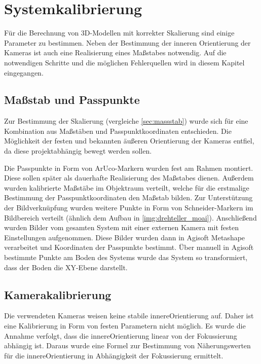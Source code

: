 \documentclass[./00PhotoBox.tex]{subfiles}
\begin{document}
\chapter{Systemkalibrierung}
\label{ch:kalibrierung}

Für die Berechnung von 3D-Modellen mit korrekter Skalierung sind einige Parameter zu bestimmen. Neben der Bestimmung der inneren Orientierung der Kameras ist auch eine Realisierung eines Maßstabes notwendig. Auf die notwendigen Schritte und die möglichen Fehlerquellen wird in diesem Kapitel eingegangen.

\section{Maßstab und Passpunkte}
\label{sec:passpunkt_bestimmung}
Zur Bestimmung der Skalierung (vergleiche \autoref{sec:massstab}) wurde sich für eine Kombination aus Maß\-stäben und Passpunktkoordinaten entschieden. Die Möglichkeit der festen und bekannten äußeren Orientierung der Kameras entfiel, da diese projektabhängig bewegt werden sollen.

Die Passpunkte in Form von ArUco-Markern wurden fest am Rahmen montiert. Diese sollen später als dauerhafte Realisierung des Maßstabes dienen. Außerdem wurden kalibrierte Maßstäbe im Objektraum verteilt, welche für die erstmalige Bestimmung der Passpunktkoordinaten den Maßstab bilden. Zur Unterstützung der Bildverknüpfung wurden weitere Punkte in Form von Schneider-Markern im Bildbereich verteilt (ähnlich dem Aufbau in \autoref{img:drehteller_moai}). Anschließend wurden Bilder vom gesamten System mit  einer externen Kamera mit festen Einstellungen aufgenommen. Diese Bilder wurden dann in Agisoft Metashape verarbeitet und Koordinaten der Passpunkte bestimmt. Über manuell in Agisoft bestimmte Punkte am Boden des Systems wurde das System so transformiert, dass der Boden die XY-Ebene darstellt.

\section{Kamerakalibrierung}
Die verwendeten Kameras weisen keine stabile \gls{innereOrientierung} auf. Daher ist eine Kalibrierung in Form von festen Parametern nicht möglich. Es wurde die Annahme verfolgt, dass die \gls{innereOrientierung} linear von der Fokussierung abhängig ist. Daraus wurde eine Formel zur Bestimmung von Näherungswerten für die \gls{innereOrientierung} in Abhängigkeit der Fokussierung ermittelt.
\end{document}
